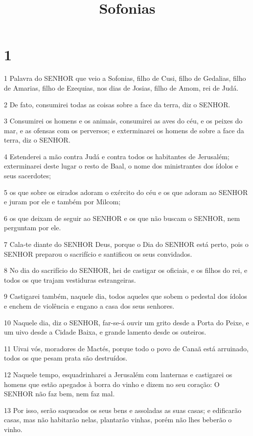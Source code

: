

\title{Sofonias}


\chapter{1}

\par 1 Palavra do SENHOR que veio a Sofonias, filho de Cusi, filho de Gedalias, filho de Amarias, filho de Ezequias, nos dias de Josias, filho de Amom, rei de Judá.
\par 2 De fato, consumirei todas as coisas sobre a face da terra, diz o SENHOR.
\par 3 Consumirei os homens e os animais, consumirei as aves do céu, e os peixes do mar, e as ofensas com os perversos; e exterminarei os homens de sobre a face da terra, diz o SENHOR.
\par 4 Estenderei a mão contra Judá e contra todos os habitantes de Jerusalém; exterminarei deste lugar o resto de Baal, o nome dos ministrantes dos ídolos e seus sacerdotes;
\par 5 os que sobre os eirados adoram o exército do céu e os que adoram ao SENHOR e juram por ele e também por Milcom;
\par 6 os que deixam de seguir ao SENHOR e os que não buscam o SENHOR, nem perguntam por ele.
\par 7 Cala-te diante do SENHOR Deus, porque o Dia do SENHOR está perto, pois o SENHOR preparou o sacrifício e santificou os seus convidados.
\par 8 No dia do sacrifício do SENHOR, hei de castigar os oficiais, e os filhos do rei, e todos os que trajam vestiduras estrangeiras.
\par 9 Castigarei também, naquele dia, todos aqueles que sobem o pedestal dos ídolos e enchem de violência e engano a casa dos seus senhores.
\par 10 Naquele dia, diz o SENHOR, far-se-á ouvir um grito desde a Porta do Peixe, e um uivo desde a Cidade Baixa, e grande lamento desde os outeiros.
\par 11 Uivai vós, moradores de Mactés, porque todo o povo de Canaã está arruinado, todos os que pesam prata são destruídos.
\par 12 Naquele tempo, esquadrinharei a Jerusalém com lanternas e castigarei os homens que estão apegados à borra do vinho e dizem no seu coração: O SENHOR não faz bem, nem faz mal.
\par 13 Por isso, serão saqueados os seus bens e assoladas as suas casas; e edificarão casas, mas não habitarão nelas, plantarão vinhas, porém não lhes beberão o vinho.
